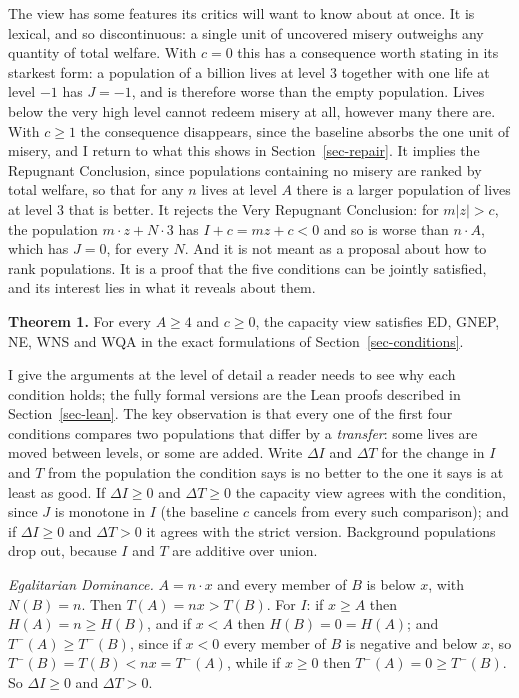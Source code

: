 \documentclass[
  11pt,
  letterpaper,
  DIV=11,
  numbers=noendperiod,
  twoside]{scrartcl}
\begin{document}
The view has some features its critics will want to know about at once.
It is lexical, and so discontinuous: a single unit of uncovered misery
outweighs any quantity of total welfare. With \(c = 0\) this has a
consequence worth stating in its starkest form: a population of a
billion lives at level 3 together with one life at level \(-1\) has
\(J = -1\), and is therefore worse than the empty population. Lives
below the very high level cannot redeem misery at all, however many
there are. With \(c \geq 1\) the consequence disappears, since the
baseline absorbs the one unit of misery, and I return to what this shows
in Section~\ref{sec-repair}. It implies the Repugnant Conclusion, since
populations containing no misery are ranked by total welfare, so that
for any \(n\) lives at level \(A\) there is a larger population of lives
at level 3 that is better. It rejects the Very Repugnant Conclusion: for
\(m|z| > c\), the population \(m \cdot z + N \cdot 3\) has
\(I + c = mz + c < 0\) and so is worse than \(n \cdot A\), which has
\(J = 0\), for every \(N\). And it is not meant as a proposal about how
to rank populations. It is a proof that the five conditions can be
jointly satisfied, and its interest lies in what it reveals about them.

\textbf{Theorem 1.} For every \(A \geq 4\) and \(c \geq 0\), the
capacity view satisfies ED, GNEP, NE, WNS and WQA in the exact
formulations of Section~\ref{sec-conditions}.

I give the arguments at the level of detail a reader needs to see why
each condition holds; the fully formal versions are the Lean proofs
described in Section~\ref{sec-lean}. The key observation is that every
one of the first four conditions compares two populations that differ by
a \emph{transfer}: some lives are moved between levels, or some are
added. Write \(\Delta I\) and \(\Delta T\) for the change in \(I\) and
\(T\) from the population the condition says is no better to the one it
says is at least as good. If \(\Delta I \geq 0\) and \(\Delta T \geq 0\)
the capacity view agrees with the condition, since \(J\) is monotone in
\(I\) (the baseline \(c\) cancels from every such comparison); and if
\(\Delta I \geq 0\) and \(\Delta T > 0\) it agrees with the strict
version. Background populations drop out, because \(I\) and \(T\) are
additive over union.

\emph{Egalitarian Dominance.} \(A = n \cdot x\) and every member of
\(B\) is below \(x\), with \(N(B) = n\). Then \(T(A) = nx > T(B)\). For
\(I\): if \(x \geq A\) then \(H(A) = n \geq H(B)\), and if \(x < A\)
then \(H(B) = 0 = H(A)\); and \(T^-(A) \geq T^-(B)\), since if \(x < 0\)
every member of \(B\) is negative and below \(x\), so
\(T^-(B) = T(B) < nx = T^-(A)\), while if \(x \geq 0\) then
\(T^-(A) = 0 \geq T^-(B)\). So \(\Delta I \geq 0\) and \(\Delta T > 0\).
\end{document}
